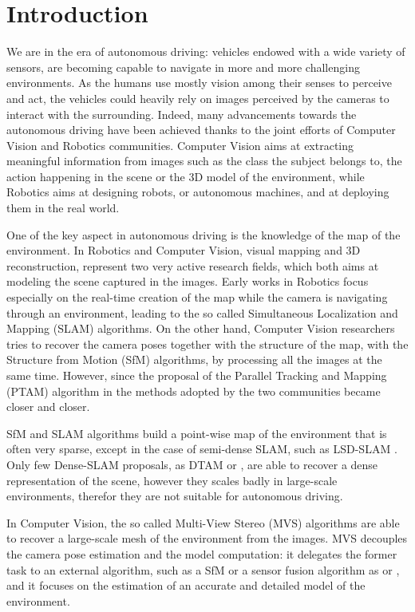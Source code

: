 
\chapter{Introduction}
\label{sec:intro}
We are in the era of autonomous driving: vehicles endowed with a wide variety of sensors, are becoming  capable to navigate in more and more challenging environments.
As the humans use mostly vision among their senses to perceive and act, the vehicles could heavily rely on images perceived by the cameras to interact with the surrounding.
Indeed, many advancements towards the autonomous driving have been achieved thanks to the joint efforts of Computer Vision and Robotics communities.
Computer Vision aims at extracting meaningful information from images such as the class the subject belongs to, the action happening in the scene or the 3D model of the environment, while Robotics aims at designing robots, or autonomous machines, and at deploying them in the real world.

One of the key aspect in autonomous driving is the knowledge of the map of the environment. 
In Robotics and Computer Vision, visual mapping and 3D reconstruction, represent two very active research fields, which both aims at modeling the scene captured in the images.
Early works in Robotics focus especially on the real-time creation of the map while the camera is navigating through an environment, leading to the so called Simultaneous Localization and Mapping (SLAM) algorithms. 
On the other hand, Computer Vision researchers tries to recover the  camera poses together with the structure of the map, with the Structure from Motion (SfM) algorithms, by processing all the images at the same time.
However, since the proposal of the Parallel Tracking and Mapping (PTAM) algorithm in \cite{klein_murray07} the methods adopted by the two communities became closer and closer.

SfM and SLAM algorithms build a point-wise map of the environment that is often very sparse, except in the case of semi-dense SLAM, such as LSD-SLAM \cite{engel2014lsd}. 
Only few Dense-SLAM proposals, as DTAM \cite{newcombe2011dtam} or \cite{newcombe2010live}, are able to recover a dense representation of the scene, however they scales badly in large-scale environments, therefor they are not suitable for autonomous driving.

In Computer Vision, the so called Multi-View Stereo (MVS) algorithms are able to recover a large-scale mesh of the environment from the images. 
MVS decouples the camera pose estimation and the model computation: it delegates the former task to an external algorithm, such as a SfM or a sensor fusion algorithm as \cite{mouragnon_et_al07} or \cite{cucci_matteucci13}, and it focuses on the estimation of an accurate and detailed model of the environment.

